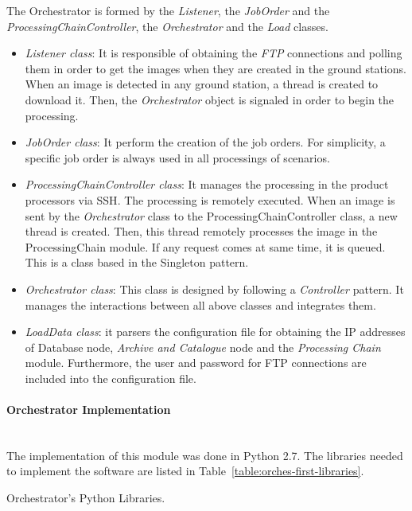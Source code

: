 The Orchestrator is formed by the \emph{Listener}, the \emph{JobOrder} and
the \emph{ProcessingChainController}, the \emph{Orchestrator} and the \emph{Load} classes.

\begin{itemize}
\item \emph{Listener class}: It is responsible of obtaining the \emph{FTP}
  connections and polling them in order to get the images when they are created in the
  ground stations. When an image is detected in any ground station, a thread is
  created to download it. Then, the \emph{Orchestrator} object is signaled in order
  to begin the processing.
\item \emph{JobOrder class}: It perform the creation of the job orders. For
  simplicity, a specific job order is always used in all
  processings of scenarios.
\item \emph{ProcessingChainController class}: It  manages the processing in the
  product processors via \ac{SSH}. The processing is remotely executed. When an image is
  sent by the \emph{Orchestrator} class to the ProcessingChainController class, a
  new thread is created. Then, this thread remotely processes the image in the
  ProcessingChain module. If any request comes at same time, it is queued.
  This is a class based in the Singleton pattern.
\item \emph{Orchestrator class}: This class is designed by following a \emph{Controller}
  pattern. It manages the interactions between all above classes and integrates
  them.
\item \emph{LoadData class}: it parsers the configuration file for obtaining the
  \ac{IP} addresses of Database node, \emph{Archive and Catalogue} node and the
  \emph{Processing Chain} module. Furthermore, the user and password for \ac{FTP}
  connections are included into the configuration file. 
\end{itemize}



\paragraph{Orchestrator Implementation}~\\

The implementation of this module was done in Python 2.7. The libraries
needed to implement the software are listed in Table~\ref{table:orches-first-libraries}.

\begin{table}[hp]
  \centering
  {\small
  
  }
  \caption{Orchestrator’s Python Libraries.}
  \label{table:orches-first-libraries}
\end{table}

